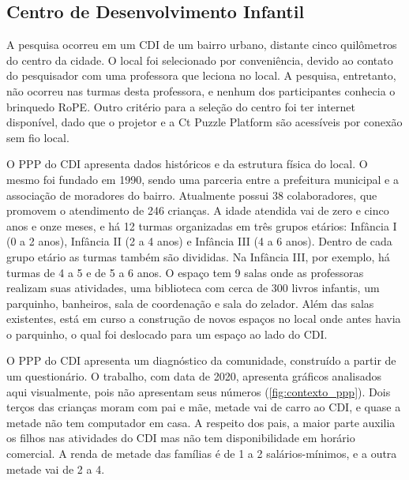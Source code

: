\subsection{Centro de Desenvolvimento Infantil}
\label{sec:cdi}
A pesquisa ocorreu em um \ac{CDI} de um bairro urbano, distante cinco quilômetros do centro da cidade. O local foi selecionado por conveniência, devido ao contato do pesquisador com uma professora que leciona no local. A pesquisa, entretanto, não ocorreu nas turmas desta professora, e nenhum dos participantes conhecia o brinquedo RoPE. Outro critério para a seleção do centro foi ter internet disponível, dado que o projetor e a Ct Puzzle Platform são acessíveis por conexão sem fio local.
 
O \ac{PPP} do \ac{CDI} apresenta dados históricos e da estrutura física do local. O mesmo foi fundado em 1990, sendo uma parceria entre a prefeitura municipal e a associação de moradores do bairro. Atualmente possui 38 colaboradores, que promovem o atendimento de 246 crianças. A idade atendida vai de zero e cinco anos e onze meses, e há 12 turmas organizadas em três grupos etários: Infância I (0 a 2 anos), Infância II (2 a 4 anos) e Infância III (4 a 6 anos). Dentro de cada grupo etário as turmas também são divididas. Na Infância III, por exemplo, há turmas de 4 a 5 e de 5 a 6 anos. O espaço tem 9 salas onde as professoras realizam suas atividades, uma biblioteca com cerca de 300 livros infantis, um parquinho, banheiros, sala de coordenação e sala do zelador. Além das salas existentes, está em curso a construção de novos espaços no local onde antes havia o parquinho, o qual foi deslocado para um espaço ao lado do CDI.
 
O \ac{PPP} do \ac{CDI} apresenta um diagnóstico da comunidade, construído a partir de um questionário. O trabalho, com data de 2020, apresenta gráficos analisados aqui visualmente, pois não apresentam seus números (\autoref{fig:contexto_ppp}). Dois terços das crianças moram com pai e mãe, metade vai de carro ao \ac{CDI}, e quase a metade não tem computador em casa. A respeito dos pais, a maior parte auxilia os filhos nas atividades do \ac{CDI} mas não tem disponibilidade em horário comercial. A renda de metade das famílias é de 1 a 2 salários-mínimos, e a outra metade vai de 2 a 4.
 
